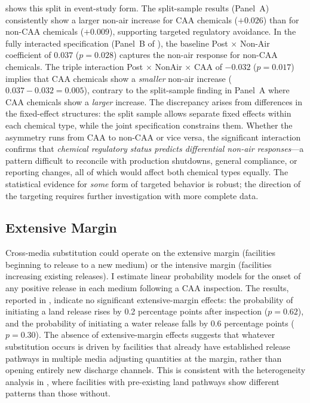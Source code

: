 \documentclass[12pt]{article}
\begin{document}
 shows this split in event-study form. The split-sample results (Panel~A) consistently show a larger non-air increase for CAA chemicals ($+0.026$) than for non-CAA chemicals ($+0.009$), supporting targeted regulatory avoidance. In the fully interacted specification (Panel~B of ), the baseline Post $\times$ Non-Air coefficient of $0.037$ ($p = 0.028$) captures the non-air response for non-CAA chemicals. The triple interaction Post $\times$ NonAir $\times$ CAA of $-0.032$ ($p = 0.017$) implies that CAA chemicals show a \textit{smaller} non-air increase ($0.037 - 0.032 = 0.005$), contrary to the split-sample finding in Panel~A where CAA chemicals show a \textit{larger} increase. The discrepancy arises from differences in the fixed-effect structures: the split sample allows separate fixed effects within each chemical type, while the joint specification constrains them. Whether the asymmetry runs from CAA to non-CAA or vice versa, the significant interaction confirms that \textit{chemical regulatory status predicts differential non-air responses}---a pattern difficult to reconcile with production shutdowns, general compliance, or reporting changes, all of which would affect both chemical types equally. The statistical evidence for \textit{some} form of targeted behavior is robust; the direction of the targeting requires further investigation with more complete data.

\subsection{Extensive Margin}

Cross-media substitution could operate on the extensive margin (facilities beginning to release to a new medium) or the intensive margin (facilities increasing existing releases). I estimate linear probability models for the onset of any positive release in each medium following a CAA inspection. The results, reported in , indicate no significant extensive-margin effects: the probability of initiating a land release rises by 0.2 percentage points after inspection ($p = 0.62$), and the probability of initiating a water release falls by 0.6 percentage points ($p = 0.30$). The absence of extensive-margin effects suggests that whatever substitution occurs is driven by facilities that already have established release pathways in multiple media adjusting quantities at the margin, rather than opening entirely new discharge channels. This is consistent with the heterogeneity analysis in , where facilities with pre-existing land pathways show different patterns than those without.
\end{document}
